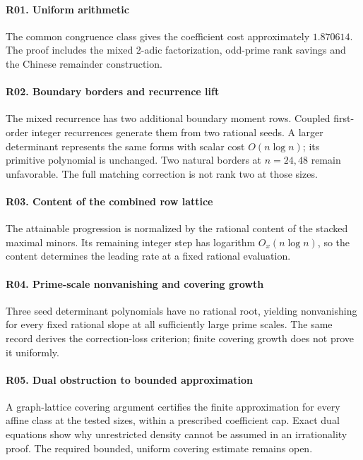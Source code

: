 \paragraph{R01. Uniform arithmetic}\label{record-R01}
The common congruence class gives the coefficient cost approximately $1.870614$. The proof includes the mixed 2-adic factorization, odd-prime rank savings and the Chinese remainder construction.

\paragraph{R02. Boundary borders and recurrence lift}\label{record-R02}
The mixed recurrence has two additional boundary moment rows. Coupled first-order integer recurrences generate them from two rational seeds. A larger determinant represents the same forms with scalar cost $O(n\log n)$; its primitive polynomial is unchanged. Two natural borders at $n=24,48$ remain unfavorable. The full matching correction is not rank two at those sizes.

\paragraph{R03. Content of the combined row lattice}\label{record-R03}
The attainable progression is normalized by the rational content of the stacked maximal minors. Its remaining integer step has logarithm $O_x(n\log n)$, so the content determines the leading rate at a fixed rational evaluation.

\paragraph{R04. Prime-scale nonvanishing and covering growth}\label{record-R04}
Three seed determinant polynomials have no rational root, yielding nonvanishing for every fixed rational slope at all sufficiently large prime scales. The same record derives the correction-loss criterion; finite covering growth does not prove it uniformly.

\paragraph{R05. Dual obstruction to bounded approximation}\label{record-R05}
A graph-lattice covering argument certifies the finite approximation for every affine class at the tested sizes, within a prescribed coefficient cap. Exact dual equations show why unrestricted density cannot be assumed in an irrationality proof. The required bounded, uniform covering estimate remains open.

